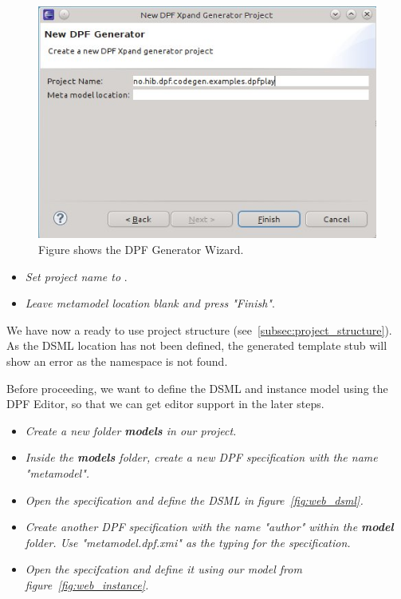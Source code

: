 \begin{figure}[h!]
  \centering
  \centerline{\includegraphics[scale=0.7]{images/codegen_wizard2.jpeg}}
  \caption[DPF Generator wizard]{Figure shows the DPF Generator Wizard.}
  \label{fig:codegen_wizard2}
\end{figure}

\begin{itemize}
  \item \emph{Set project name to }.
  \item \emph{Leave metamodel location blank and press "Finish"}.
\end{itemize}

We have now a ready to use project structure (see~\ref{subsec:project_structure}). As the DSML location has not been defined, the generated template stub will show an error as the  namespace is not found.

Before proceeding, we want to define the DSML and instance model using the DPF Editor, so that we can get editor support in the later steps.

\begin{itemize}
  \item \emph{Create a new folder \textbf{models} in our project.}
  \item \emph{Inside the \textbf{models} folder, create a new DPF specification with the name "metamodel".}
  \item \emph{Open the specification and define the DSML in figure~\ref{fig:web_dsml}.}
  \item \emph{Create another DPF specification with the name "author" within the \textbf{model} folder. Use "metamodel.dpf.xmi" as the typing for the specification.}
  \item \emph{Open the specifcation and define it using our model from figure~\ref{fig:web_instance}.}
\end{itemize}

